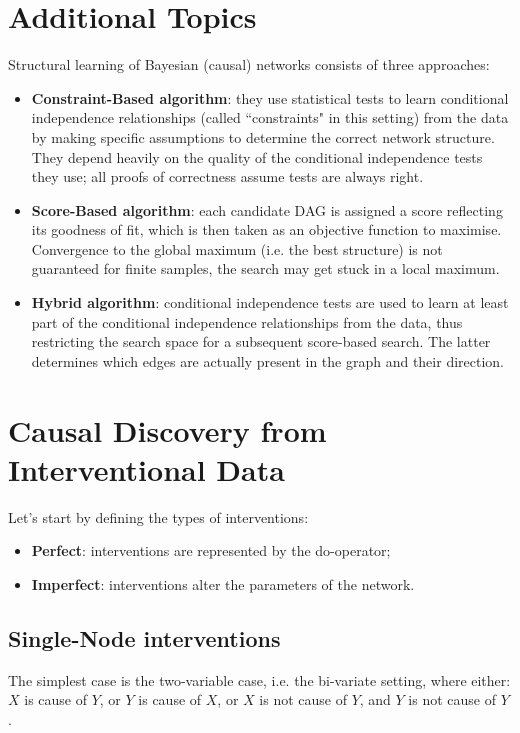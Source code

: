 \section{Additional Topics}
Structural learning of Bayesian (causal) networks consists of three approaches:
\begin{itemize}
    \item \textbf{Constraint-Based algorithm}: they use statistical tests to learn
          conditional independence relationships (called “constraints" in this
          setting) from the data by making specific assumptions to determine the
          correct network structure. They depend heavily on the quality of the
          conditional independence tests they use; all proofs of correctness
          assume tests are always right.
    \item \textbf{Score-Based algorithm}: each candidate DAG is assigned a score
          reflecting its goodness of fit, which is then taken as an objective
          function to maximise. Convergence to the global maximum (i.e. the best
          structure) is not guaranteed for finite samples, the search may get
          stuck in a local maximum.
    \item \textbf{Hybrid algorithm}: conditional independence tests are used to
          learn at least part of the conditional independence relationships from
          the data, thus restricting the search space for a subsequent score-based
          search. The latter determines which edges are actually present in the
          graph and their direction.
\end{itemize}
\section{Causal Discovery from Interventional Data}
Let's start by defining the types of interventions:
\begin{itemize}
    \item \textbf{Perfect}: interventions are represented by the do-operator;
    \item \textbf{Imperfect}: interventions alter the parameters of the network.
\end{itemize}
\subsection{Single-Node interventions}
The simplest case is the two-variable case, i.e. the bi-variate setting, where
either: $X$ is cause of $Y$, or $Y$ is cause of $X$, or $X$ is not cause of $Y$,
and $Y$ is not cause of $Y$.

